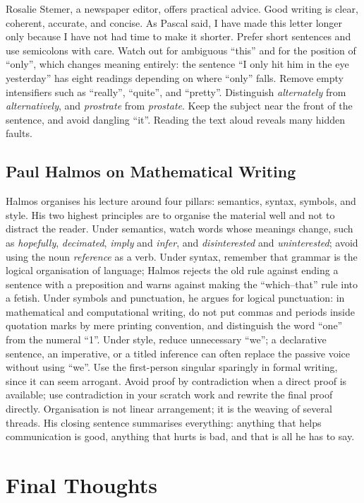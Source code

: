 \documentclass[11pt]{article}
\begin{document}
Rosalie Stemer, a newspaper editor, offers practical advice. Good writing is clear, coherent, accurate, and concise. As Pascal said, I have made this letter longer only because I have not had time to make it shorter. Prefer short sentences and use semicolons with care. Watch out for ambiguous ``this'' and for the position of ``only'', which changes meaning entirely: the sentence ``I only hit him in the eye yesterday'' has eight readings depending on where ``only'' falls. Remove empty intensifiers such as ``really'', ``quite'', and ``pretty''. Distinguish \emph{alternately} from \emph{alternatively}, and \emph{prostrate} from \emph{prostate}. Keep the subject near the front of the sentence, and avoid dangling ``it''. Reading the text aloud reveals many hidden faults.

\subsection{Paul Halmos on Mathematical Writing}

Halmos organises his lecture around four pillars: semantics, syntax, symbols, and style. His two highest principles are to organise the material well and not to distract the reader. Under semantics, watch words whose meanings change, such as \emph{hopefully}, \emph{decimated}, \emph{imply} and \emph{infer}, and \emph{disinterested} and \emph{uninterested}; avoid using the noun \emph{reference} as a verb. Under syntax, remember that grammar is the logical organisation of language; Halmos rejects the old rule against ending a sentence with a preposition and warns against making the ``which--that'' rule into a fetish. Under symbols and punctuation, he argues for logical punctuation: in mathematical and computational writing, do not put commas and periods inside quotation marks by mere printing convention, and distinguish the word ``one'' from the numeral ``1''. Under style, reduce unnecessary ``we''; a declarative sentence, an imperative, or a titled inference can often replace the passive voice without using ``we''. Use the first-person singular sparingly in formal writing, since it can seem arrogant. Avoid proof by contradiction when a direct proof is available; use contradiction in your scratch work and rewrite the final proof directly. Organisation is not linear arrangement; it is the weaving of several threads. His closing sentence summarises everything: anything that helps communication is good, anything that hurts is bad, and that is all he has to say.

\section{Final Thoughts}
\end{document}
